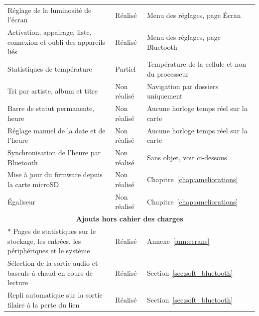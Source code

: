 \begin{longtable}{p{} p{} p{}}
  Réglage de la luminosité de l'écran                                                 & Réalisé       & Menu des réglages, page Écran                        \\
  Activation, appairage, liste, connexion et oubli des appareils liés                 & Réalisé       & Menu des réglages, page Bluetooth                    \\
  Statistiques de température                                                         & Partiel       & Température de la cellule et non du processeur       \\
  Tri par artiste, album et titre                                                     & Non réalisé   & Navigation par dossiers uniquement                   \\
  Barre de statut permanente, heure                                                   & Non réalisé   & Aucune horloge temps réel sur la carte               \\
  Réglage manuel de la date et de l'heure                                             & Non réalisé   & Aucune horloge temps réel sur la carte               \\
  Synchronisation de l'heure par Bluetooth                                            & Non réalisé   & Sans objet, voir ci-dessous                          \\
  Mise à jour du firmware depuis la carte microSD                                     & Non réalisé   & Chapitre~\ref{chap:ameliorations}                    \\
  Égaliseur                                                                           & Non réalisé   & Chapitre~\ref{chap:ameliorations}                    \\
  \hline
  \multicolumn{3}{c}{\textbf{Ajouts hors cahier des charges}}                                                                                                \\*
  \hline
  Pages de statistiques sur le stockage, les entrées, les périphériques et le système & Réalisé       & Annexe~\ref{ann:ecrans}                              \\
  Sélection de la sortie audio et bascule à chaud en cours de lecture                 & Réalisé       & Section~\ref{sec:soft_bluetooth}                     \\
  Repli automatique sur la sortie filaire à la perte du lien                          & Réalisé       & Section~\ref{sec:soft_bluetooth}                     \\

\end{longtable}
